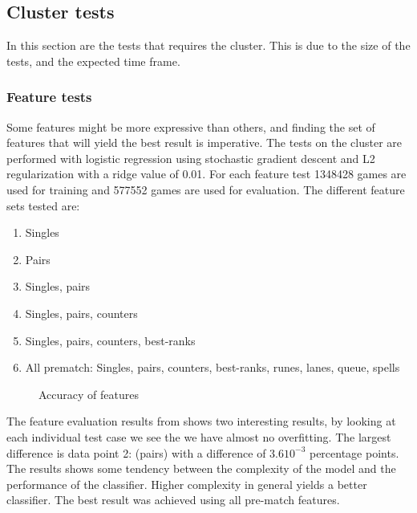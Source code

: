 \subsection{Cluster tests}\label{sec:clustertest}
In this section are the tests that requires the cluster. This is due to the size of the tests, and the expected time frame.
\subsubsection{Feature tests}\label{sec:feattest}
Some features might be more expressive than others, and finding the set of features that will yield the best result is imperative. The tests on the cluster are performed with logistic regression using stochastic gradient descent and L2 regularization with a ridge value of 0.01. 
For each feature test 1348428 games are used for training and 577552 games are used for evaluation. 
The different feature sets tested are:
\begin{enumerate}
\item Singles
\item Pairs
\item Singles, pairs
\item Singles, pairs, counters 
\item Singles, pairs, counters, best-ranks
\item All prematch: Singles, pairs, counters, best-ranks, runes, lanes, queue, spells
\end{enumerate}


\begin{figure}[!htb]
  \centering
   \caption{Accuracy of features}\label{fig:cluster-feat}
\end{figure}

The feature evaluation results from  shows two interesting results, by looking at each individual test case we see the we have almost no overfitting. The largest difference is data point 2: (pairs) with a difference of $3.610^{-3}$ percentage points. The results shows some tendency between the complexity of the model and the performance of the classifier. Higher complexity in general yields a better classifier. The best result was achieved using all pre-match features.




